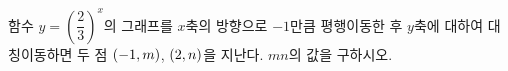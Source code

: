함수 $y=\left(\dfrac{2}{3}\right)^{x}$의 그래프를 $x$축의 방향으로 $-1$만큼 평행이동한 후 $y$축에 대하여 대칭이동하면 두 점 $(-1{,}\mkern3mu\mathopen{}m)$, $(2{,}\mkern3mu\mathopen{}n)$을 지난다. $mn$의 값을 구하시오.
